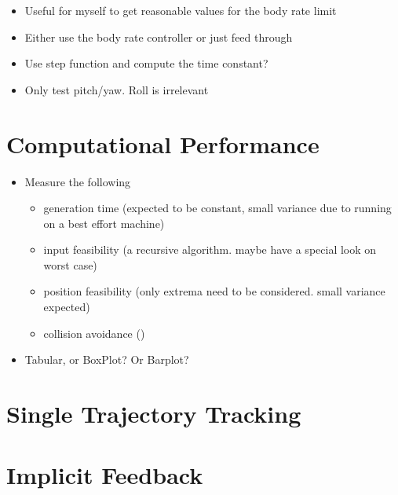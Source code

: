 \begin{itemize}
	\color{red}
	\item Useful for myself to get reasonable values for the body rate limit
	\item Either use the body rate controller or just feed through
	\item Use step function and compute the time constant?
	\item Only test pitch/yaw. Roll is irrelevant
\end{itemize}

\section{Computational Performance}

\begin{itemize}
	\color{red}
	\item Measure the following
	\begin{itemize}
		\item generation time (expected to be constant, small variance due to running on a best effort machine)
		\item input feasibility (a recursive algorithm. maybe have a special look on worst case)
		\item position feasibility (only extrema need to be considered. small variance expected)
		\item collision avoidance ()
	\end{itemize}
	\item Tabular, or BoxPlot? Or Barplot? 
\end{itemize}

\section{Single Trajectory Tracking}


\section{Implicit Feedback}